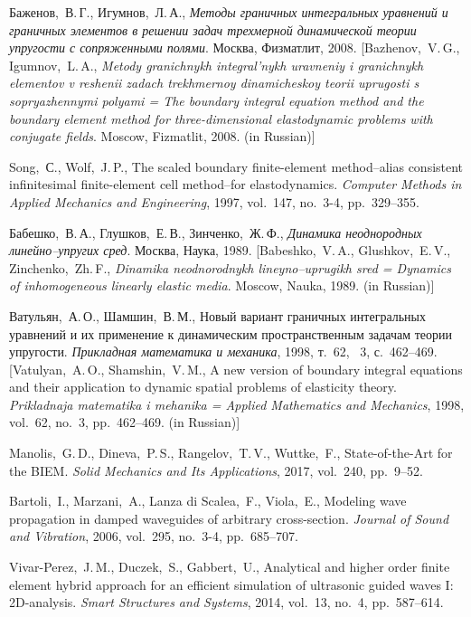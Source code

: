 \documentclass[press]{vestnik}
\begin{document}
\begin{thebibliography}{23}
Баженов,~В.\,Г., Игумнов,~Л.\,А., \emph{Методы граничных интегральных уравнений и граничных элементов в решении задач трехмерной динамической теории упругости с сопряженными полями}. Москва, Физматлит, 2008. [Bazhenov,~V.\,G., Igumnov,~L.\,A., \emph{Metody granichnykh integral’nykh uravneniy i granichnykh elementov v reshenii zadach trekhmernoy dinamicheskoy teorii uprugosti s sopryazhennymi polyami = The boundary integral equation method and the boundary element method for three-dimensional elastodynamic problems with conjugate fields}. Moscow, Fizmatlit, 2008. (in Russian)]

Song,~С., Wolf,~J.\,P., The scaled boundary finite-element method–alias consistent infinitesimal finite-element cell method–for elastodynamics. \emph{Computer Methods in Applied Mechanics and Engineering}, 1997, vol.~147, no.~3-4, pp.~329--355. 

Бабешко,~В.\,А., Глушков,~Е.\,В., Зинченко,~Ж.\,Ф., \emph{Динамика неоднородных линейно–упругих сред}. Москва, Наука, 1989. [Babeshko,~V.\,A., Glushkov,~E.\,V., Zinchenko,~Zh.\,F., \emph{Dinamika neodnorodnykh lineyno–uprugikh sred = Dynamics of inhomogeneous linearly elastic media}. Moscow, Nauka, 1989. (in Russian)]

Ватульян,~А.\,О., Шамшин,~В.\,М., Новый вариант граничных интегральных уравнений и их применение к динамическим пространственным задачам теории упругости. \emph{Прикладная математика и механика}, 1998, т.~62, \No~3, с.~462--469. [Vatulyan,~A.\,O., Shamshin,~V.\,M., A new version of boundary integral equations and their application to dynamic spatial problems of elasticity theory. \emph{Prikladnaja matematika i mehanika = Applied Mathematics and Mechanics}, 1998, vol.~62, no.~3, pp.~462--469. (in Russian)]

Manolis,~G.\,D., Dineva,~P.\,S., Rangelov,~T.\,V., Wuttke,~F., State-of-the-Art for the BIEM. \emph{Solid Mechanics and Its Applications}, 2017, vol.~240, pp.~9--52. 

Bartoli,~I., Marzani,~A., Lanza di Scalea,~F., Viola,~E., Modeling wave propagation in damped waveguides of arbitrary cross-section. \emph{Journal of Sound and Vibration}, 2006, vol.~295, no.~3-4, pp.~685--707. 

Vivar-Perez,~J.\,M., Duczek,~S., Gabbert,~U., Analytical and higher order finite element hybrid approach for an efficient simulation of ultrasonic guided waves I: 2D-analysis. \emph{Smart Structures and Systems}, 2014, vol.~13, no.~4, pp.~587--614. 


\end{thebibliography}
\end{document}
